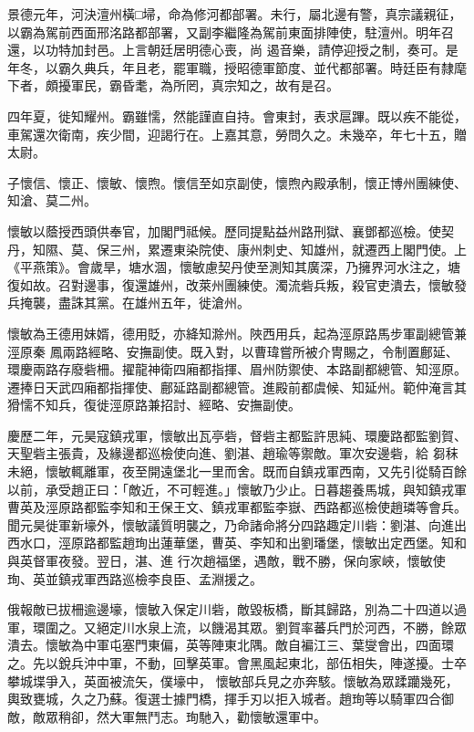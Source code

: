 \begin{pinyinscope}
 景德元年，河決澶州橫□埽，命為修河都部署。未行，屬北邊有警，真宗議親征，以霸為駕前西面邢洺路都部署，又副李繼隆為駕前東面排陣使，駐澶州。明年召還，以功特加封邑。上言朝廷居明德心喪，尚
 遏音樂，請停迎授之制，奏可。是年冬，以霸久典兵，年且老，罷軍職，授昭德軍節度、並代都部署。時廷臣有隸麾下者，頗擾軍民，霸昏耄，為所罔，真宗知之，故有是召。



 四年夏，徙知耀州。霸雖懦，然能謹直自持。會東封，表求扈蹕。既以疾不能從，車駕還次衛南，疾少間，迎謁行在。上嘉其意，勞問久之。未幾卒，年七十五，贈太尉。



 子懷信、懷正、懷敏、懷煦。懷信至如京副使，懷煦內殿承制，懷正博州團練使、知滄、莫二州。



 懷敏以蔭授西頭供奉官，加閣門祗候。歷同提點益州路刑獄、襄鄧都巡檢。使契丹，知隰、莫、保三州，累遷東染院使、康州刺史、知雄州，就遷西上閣門使。上《平燕策》。會歲旱，塘水涸，懷敏慮契丹使至測知其廣深，乃擁界河水注之，塘復如故。召對邊事，復還雄州，改萊州團練使。濁流砦兵叛，殺官吏潰去，懷敏發兵掩襲，盡誅其黨。在雄州五年，徙滄州。



 懷敏為王德用妹婿，德用貶，亦絳知滁州。陜西用兵，起為涇原路馬步軍副總管兼涇原秦
 鳳兩路經略、安撫副使。既入對，以曹瑋嘗所被介冑賜之，令制置鄜延、環慶兩路存廢砦柵。擢龍神衛四廂都指揮、眉州防禦使、本路副都總管、知涇原。遷捧日天武四廂都指揮使、鄜延路副都總管。進殿前都虞候、知延州。範仲淹言其猾懦不知兵，復徙涇原路兼招討、經略、安撫副使。



 慶歷二年，元昊寇鎮戎軍，懷敏出瓦亭砦，督砦主都監許思純、環慶路都監劉賀、天聖砦主張貴，及緣邊都巡檢使向進、劉湛、趙瑜等禦敵。軍次安邊砦，給
 芻秣未絕，懷敏輒離軍，夜至開遠堡北一里而舍。既而自鎮戎軍西南，又先引從騎百餘以前，承受趙正曰：「敵近，不可輕進。」懷敏乃少止。日暮趨養馬城，與知鎮戎軍曹英及涇原路都監李知和王保王文、鎮戎軍都監李嶽、西路都巡檢使趙璘等會兵。聞元昊徙軍新壕外，懷敏議質明襲之，乃命諸命將分四路趣定川砦：劉湛、向進出西水口，涇原路都監趙珣出蓮華堡，曹英、李知和出劉璠堡，懷敏出定西堡。知和與英督軍夜發。翌日，湛、進
 行次趙福堡，遇敵，戰不勝，保向家峽，懷敏使珣、英並鎮戎軍西路巡檢李良臣、孟淵援之。



 俄報敵已拔柵逾邊壕，懷敏入保定川砦，敵毀板橋，斷其歸路，別為二十四道以過軍，環圍之。又絕定川水泉上流，以饑渴其眾。劉賀率蕃兵門於河西，不勝，餘眾潰去。懷敏為中軍屯塞門東偏，英等陣東北隅。敵自褊江三、葉燮會出，四面環之。先以銳兵沖中軍，不動，回擊英軍。會黑風起東北，部伍相失，陣遂擾。士卒攀城堞爭入，英面被流矢，僕壕中，
 懷敏部兵見之亦奔駭。懷敏為眾蹂躪幾死，輿致甕城，久之乃蘇。復選士據門橋，揮手刃以拒入城者。趙珣等以騎軍四合御敵，敵眾稍卻，然大軍無鬥志。珣馳入，勸懷敏還軍中。




\end{pinyinscope}
